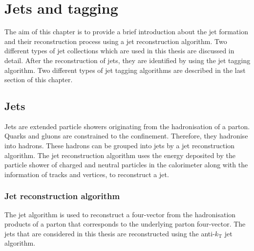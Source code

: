 


\chapter{Jets and tagging}
\label{sec:jetsandtaggers}
The aim of this chapter is to provide a brief introduction about the jet formation and their reconstruction process using a jet reconstruction algorithm. Two different types of jet collections which are used in this thesis are discussed in detail. After the reconstruction of jets, they are identified by using the jet tagging algorithm. Two different types of jet tagging algorithms are described in the last section of this chapter. 
\section{Jets}
\label{sec:jetsandtaggers:jets}
Jets are extended particle showers originating from the hadronisation of a parton. Quarks and gluons are constrained to the confinement. Therefore, they hadronise into hadrons. These hadrons can be grouped into jets by a jet reconstruction algorithm. The jet reconstruction algorithm uses the energy deposited by the particle shower of charged and neutral particles in the calorimeter along with the information of tracks and vertices, to reconstruct a jet.

\subsection{Jet reconstruction algorithm}
\label{sec:jetsandtaggers:jets:algorithm}
The jet algorithm is used to reconstruct a four-vector from the hadronisation products of a parton that corresponds to the underlying parton four-vector. The jets that are considered in this thesis are reconstructed using the anti-$k_{\text{T}}$ jet algorithm.~\cite{antikt} 

